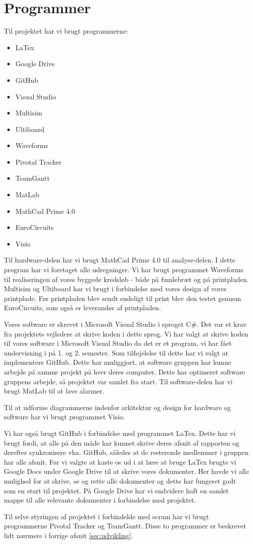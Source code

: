 \section{Programmer}

Til projektet har vi brugt programmerne: 

\begin{itemize}
	\item LaTex
	\item Google Drive
	\item GitHub
	\item Visual Studio
	\item Multisim
	\item Ultiboard
	\item Waveforms
	\item Pivotal Tracker
	\item TeamGantt
	\item MatLab
	\item MathCad Prime 4.0
	\item EuroCircuits 
	\item Visio
\end{itemize}

Til hardware-delen har vi brugt MathCad Prime 4.0 til analyse-delen. I dette program har vi foretaget alle udregninger. Vi har brugt programmet Waveforms til realiseringen af vores byggede kredsløb - både på fumlebræt og på printpladen. 
Multisim og Ultiboard har vi brugt i forbindelse med vores design af vores printplade. Før printpladen blev sendt endeligt til print blev den testet gennem EuroCircuits, som også er leverandør af printpladen. 

Vores software er skrevet i Microsoft Visual Studio i sproget C\#. Det var et krav fra projektets vejledere at skrive koden i dette sprog. Vi har valgt at skrive koden til vores software i Microsoft Visual Studio da det er et program, vi har fået undervisning i på 1. og 2. semester. Som tilføjelelse til dette har vi valgt at implementere GitHub. Dette har muliggjort, at software gruppen har kunne arbejde på samme projekt på hver deres computer. Dette har optimeret software gruppens arbejde, så projektet var samlet fra start. Til software-delen har vi brugt MatLab til at lave alarmer.

Til at udforme diagrammerne indenfor arkitektur og design for hardware og software har vi brugt programmet Visio. 

Vi har også brugt GitHub i forbindelse med programmet LaTex. Dette har vi brugt fordi, at alle på den måde har kunnet skrive deres afsnit af rapporten og derefter synkronisere vha. GitHub, således at de resterende medlemmer i gruppen har alle afsnit.
Før vi valgte at kaste os ud i at lære at bruge LaTex brugte vi Google Docs under Google Drive til at skrive vores dokumenter. Her havde vi alle mulighed for at skrive, se og rette alle dokumenter og dette har fungeret godt som en start til projektet. På Google Drive har vi endvidere haft en samlet mappe til alle relevante dokumenter i forbindelse med projektet. 

Til selve styringen af projektet i forbindelde med scrum har vi brugt programmerne Pivotal Tracker og TeamGantt. Disse to programmer er beskrevet lidt nærmere i forrige afsnit \vref{sec:udvikling}. 
